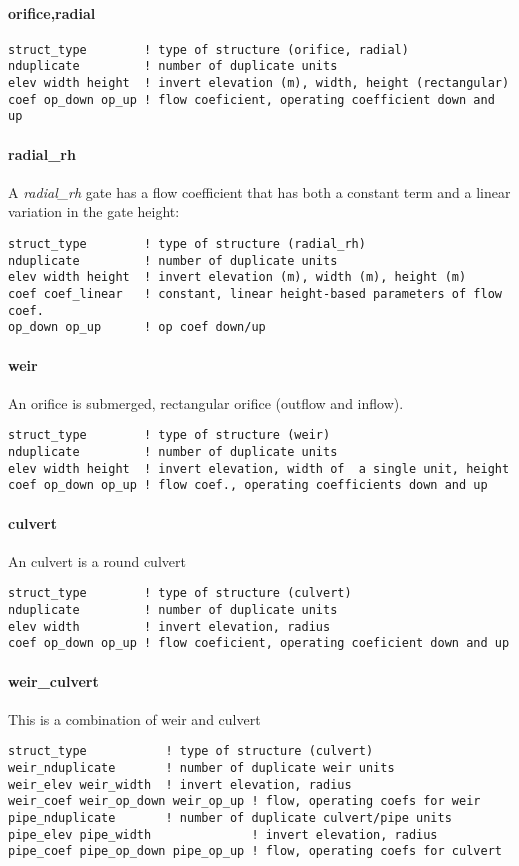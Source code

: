 \paragraph{orifice,radial}
\begin{verbatim}
struct_type        ! type of structure (orifice, radial)
nduplicate         ! number of duplicate units
elev width height  ! invert elevation (m), width, height (rectangular)
coef op_down op_up ! flow coeficient, operating coefficient down and up
\end{verbatim}

\paragraph{radial\_rh}
A {\em radial\_rh} gate has a flow coefficient that has both
a constant term and a linear variation in the gate height:
\begin{verbatim}
struct_type        ! type of structure (radial_rh)
nduplicate         ! number of duplicate units
elev width height  ! invert elevation (m), width (m), height (m)
coef coef_linear   ! constant, linear height-based parameters of flow coef.
op_down op_up      ! op coef down/up
\end{verbatim}

\paragraph{weir}
An orifice is submerged, rectangular orifice (outflow and inflow). 
\begin{verbatim}
struct_type        ! type of structure (weir)
nduplicate         ! number of duplicate units
elev width height  ! invert elevation, width of  a single unit, height
coef op_down op_up ! flow coef., operating coefficients down and up
\end{verbatim}

\paragraph{culvert}
An culvert is a round culvert
\begin{verbatim}
struct_type        ! type of structure (culvert)
nduplicate         ! number of duplicate units
elev width         ! invert elevation, radius
coef op_down op_up ! flow coeficient, operating coeficient down and up
\end{verbatim}

\paragraph{weir\_culvert}
This is a combination of weir and culvert
\begin{verbatim}
struct_type           ! type of structure (culvert)
weir_nduplicate       ! number of duplicate weir units
weir_elev weir_width  ! invert elevation, radius
weir_coef weir_op_down weir_op_up ! flow, operating coefs for weir
pipe_nduplicate       ! number of duplicate culvert/pipe units
pipe_elev pipe_width              ! invert elevation, radius
pipe_coef pipe_op_down pipe_op_up ! flow, operating coefs for culvert
\end{verbatim}

